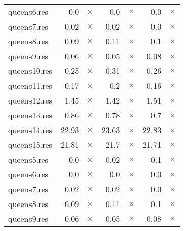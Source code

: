 \documentclass{article}
\begin{document}
\begin{center}
\begin{tabular}{l
rrrrrr}
queens6.res & 0.0 & 
$\times$
 & 0.0 & 
$\times$
 & 0.0 & 
$\times$
\\
queens7.res & 0.02 & 
$\times$
 & 0.02 & 
$\times$
 & 0.0 & 
$\times$
\\
queens8.res & 0.09 & 
$\times$
 & 0.11 & 
$\times$
 & 0.1 & 
$\times$
\\
queens9.res & 0.06 & 
$\times$
 & 0.05 & 
$\times$
 & 0.08 & 
$\times$
\\
queens10.res & 0.25 & 
$\times$
 & 0.31 & 
$\times$
 & 0.26 & 
$\times$
\\
queens11.res & 0.17 & 
$\times$
 & 0.2 & 
$\times$
 & 0.16 & 
$\times$
\\
queens12.res & 1.45 & 
$\times$
 & 1.42 & 
$\times$
 & 1.51 & 
$\times$
\\
queens13.res & 0.86 & 
$\times$
 & 0.78 & 
$\times$
 & 0.7 & 
$\times$
\\
queens14.res & 22.93 & 
$\times$
 & 23.63 & 
$\times$
 & 22.83 & 
$\times$
\\
queens15.res & 21.81 & 
$\times$
 & 21.7 & 
$\times$
 & 21.71 & 
$\times$
\\
queens5.res & 0.0 & 
$\times$
 & 0.02 & 
$\times$
 & 0.1 & 
$\times$
\\
queens6.res & 0.0 & 
$\times$
 & 0.0 & 
$\times$
 & 0.0 & 
$\times$
\\
queens7.res & 0.02 & 
$\times$
 & 0.02 & 
$\times$
 & 0.0 & 
$\times$
\\
queens8.res & 0.09 & 
$\times$
 & 0.11 & 
$\times$
 & 0.1 & 
$\times$
\\
queens9.res & 0.06 & 
$\times$
 & 0.05 & 
$\times$
 & 0.08 & 
$\times$
\\
\hline\end{tabular}
\end{center}
\end{document}
